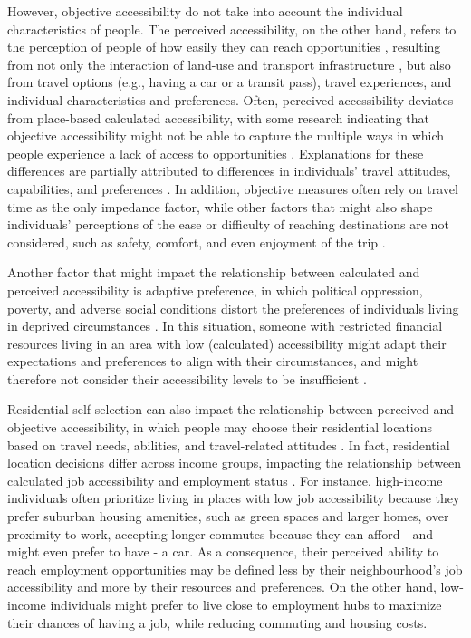\documentclass[preprint, 3p,
authoryear]{elsarticle} %
\begin{document}
However, objective accessibility do not take into account the individual
characteristics of people. The perceived accessibility, on the other
hand, refers to the perception of people of how easily they can reach
opportunities \citep{lättman2016, pot2025, mehdizadeh2025}, resulting
from not only the interaction of land-use and transport infrastructure
\citep{geurs2004}, but also from travel options (e.g., having a car or a
transit pass), travel experiences, and individual characteristics and
preferences. Often, perceived accessibility deviates from place-based
calculated accessibility, with some research indicating that objective
accessibility might not be able to capture the multiple ways in which
people experience a lack of access to opportunities \citep{zhu2025}.
Explanations for these differences are partially attributed to
differences in individuals' travel attitudes, capabilities, and
preferences \citep{devos2025, vandervlugt2022}. In addition, objective
measures often rely on travel time as the only impedance factor, while
other factors that might also shape individuals' perceptions of the ease
or difficulty of reaching destinations are not considered, such as
safety, comfort, and even enjoyment of the trip
\citep{handy2001evaluating, handy2020}.

Another factor that might impact the relationship between calculated and
perceived accessibility is adaptive preference, in which political
oppression, poverty, and adverse social conditions distort the
preferences of individuals living in deprived circumstances
\citep{baber2007}. In this situation, someone with restricted financial
resources living in an area with low (calculated) accessibility might
adapt their expectations and preferences to align with their
circumstances, and might therefore not consider their accessibility
levels to be insufficient \citep{negm2025}.

Residential self-selection can also impact the relationship between
perceived and objective accessibility, in which people may choose their
residential locations based on travel needs, abilities, and
travel-related attitudes \citep{cao2009}. In fact, residential location
decisions differ across income groups, impacting the relationship
between calculated job accessibility and employment status
\citep{Hu2017}. For instance, high-income individuals often prioritize
living in places with low job accessibility because they prefer suburban
housing amenities, such as green spaces and larger homes, over proximity
to work, accepting longer commutes because they can afford - and might
even prefer to have - a car. As a consequence, their perceived ability
to reach employment opportunities may be defined less by their
neighbourhood's job accessibility and more by their resources and
preferences. On the other hand, low-income individuals might prefer to
live close to employment hubs to maximize their chances of having a job,
while reducing commuting and housing costs.
\end{document}
